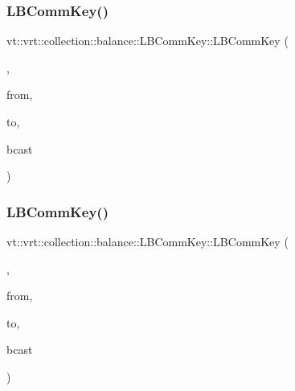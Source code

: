 \subsubsection{\texorpdfstring{L\+B\+Comm\+Key()}{LBCommKey()}\hspace{0.1cm}{\footnotesize\ttfamily [5/6]}}
{\footnotesize\ttfamily vt\+::vrt\+::collection\+::balance\+::\+L\+B\+Comm\+Key\+::\+L\+B\+Comm\+Key (\begin{DoxyParamCaption}\item[{\hyperlink{structvt_1_1vrt_1_1collection_1_1balance_1_1_l_b_comm_key_1_1_collection_to_node_tag}{Collection\+To\+Node\+Tag}}]{,  }\item[{\hyperlink{structvt_1_1vrt_1_1collection_1_1balance_1_1_element_i_d_struct}{Element\+I\+D\+Struct}}]{from,  }\item[{\hyperlink{namespacevt_a866da9d0efc19c0a1ce79e9e492f47e2}{Node\+Type}}]{to,  }\item[{bool}]{bcast }\end{DoxyParamCaption})\hspace{0.3cm}{\ttfamily [inline]}}

\mbox{\label{structvt_1_1vrt_1_1collection_1_1balance_1_1_l_b_comm_key_a6d86db5b3c010d2a00bc8971c024d299}} 
\subsubsection{\texorpdfstring{L\+B\+Comm\+Key()}{LBCommKey()}\hspace{0.1cm}{\footnotesize\ttfamily [6/6]}}
{\footnotesize\ttfamily vt\+::vrt\+::collection\+::balance\+::\+L\+B\+Comm\+Key\+::\+L\+B\+Comm\+Key (\begin{DoxyParamCaption}\item[{\hyperlink{structvt_1_1vrt_1_1collection_1_1balance_1_1_l_b_comm_key_1_1_node_to_collection_tag}{Node\+To\+Collection\+Tag}}]{,  }\item[{\hyperlink{namespacevt_a866da9d0efc19c0a1ce79e9e492f47e2}{Node\+Type}}]{from,  }\item[{\hyperlink{structvt_1_1vrt_1_1collection_1_1balance_1_1_element_i_d_struct}{Element\+I\+D\+Struct}}]{to,  }\item[{bool}]{bcast }\end{DoxyParamCaption})\hspace{0.3cm}{\ttfamily [inline]}}



